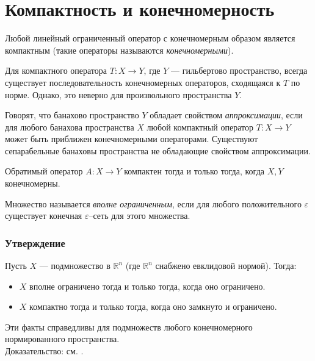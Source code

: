 \section{Компактность и конечномерность}
\label{sec:q-37}
Любой линейный ограниченный оператор с конечномерным образом является компактным (такие операторы называются \textit{конечномерными}).

Для компактного оператора ${\displaystyle T:X\to Y}$, где $Y$ --- гильбертово пространство, всегда существует последовательность конечномерных операторов, сходящаяся к $T$ по норме. Однако, это неверно для произвольного пространства $Y$.

Говорят, что банахово пространство $Y$ обладает свойством \textit{аппроксимации}, если для любого банахова пространства $X$ любой компактный оператор ${\displaystyle T:X\to Y}$ может быть приближен конечномерными операторами. Существуют сепарабельные банаховы пространства не обладающие свойством аппроксимации.

Обратимый оператор ${\displaystyle A:X\to Y}$ компактен тогда и только тогда, когда $X,Y$ конечномерны.

Множество называется \textit{вполне ограниченным}, если для любого положительного $\varepsilon$ существует конечная $\varepsilon$--сеть для этого множества.

\subsubsection*{Утверждение}
Пусть $X$ --- подмножество в $\mathbb{R}^n$ (где $\mathbb{R}^n$ снабжено евклидовой нормой). Тогда:
\begin{itemize}
	\itemsep0pt
	\item $X$ вполне ограничено тогда и только тогда, когда оно ограничено.
	\item$ X$ компактно тогда и только тогда, когда оно замкнуто и ограничено.
\end{itemize}
Эти факты справедливы для подмножеств любого конечномерного нормированного пространства.\\
Доказательство: см. \cite{fa-lectures-18}.